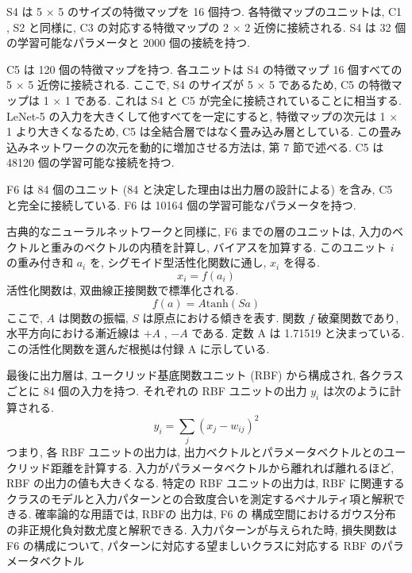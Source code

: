 \documentclass[twocolumn]{jarticle}     %
\begin{document}
  \par
  S4 は 5 × 5 のサイズの特徴マップを 16 個持つ. 各特徴マップのユニットは, C1 , S2 と同様に, C3 の対応する特徴マップの 2 × 2 近傍に接続される. S4 は 32 個の学習可能なパラメータと 2000 個の接続を持つ.
  \par
  C5 は 120 個の特徴マップを持つ. 各ユニットは S4 の特徴マップ 16 個すべての 5 × 5 近傍に接続される.
  ここで, S4 のサイズが 5 × 5 であるため, C5 の特徴マップは 1 × 1 である. これは S4 と C5 が完全に接続されていることに相当する. LeNet-5 の入力を大きくして他すべてを一定にすると, 特徴マップの次元は 1 × 1 より大きくなるため, C5 は全結合層ではなく畳み込み層としている. この畳み込みネットワークの次元を動的に増加させる方法は, 第 7 節で述べる. C5 は 48120 個の学習可能な接続を持つ.
\par
F6 は 84 個のユニット (84 と決定した理由は出力層の設計による) を含み, C5 と完全に接続している. F6 は 10164 個の学習可能なパラメータを持つ. 
\par
古典的なニューラルネットワークと同様に, F6 までの層のユニットは, 入力のベクトルと重みのベクトルの内積を計算し, バイアスを加算する. このユニット $i$ の重み付き和 $a_i$ を, シグモイド型活性化関数に通し, $x_i$ を得る. 
\begin{equation}
  x_i = f(a_i)
\end{equation}
活性化関数は, 双曲線正接関数で標準化される.
\begin{equation}
   f(a) = A\mathrm{tanh}(Sa)
\end{equation}
ここで, $A$ は関数の振幅, $S$ は原点における傾きを表す. 関数 $f$ 破棄関数であり, 水平方向における漸近線は $+A$ , $-A$ である. 定数 A は 1.71519 と決まっている. この活性化関数を選んだ根拠は付録 A に示している.
\par
最後に出力層は, ユークリッド基底関数ユニット (RBF) から構成され, 各クラスごとに 84 個の入力を持つ. それぞれの RBF ユニットの出力 $y_i$ は次のように計算される.
\begin{equation}
  y_i = \sum_{j} (x_j - w_{ij})^2
\end{equation} 
つまり, 各 RBF ユニットの出力は, 出力ベクトルとパラメータベクトルとのユークリッド距離を計算する. 入力がパラメータベクトルから離れれば離れるほど, RBF の出力の値も大きくなる. 
特定の RBF ユニットの出力は, RBF に関連するクラスのモデルと入力パターンとの合致度合いを測定するペナルティ項と解釈できる.
確率論的な用語では, RBFの 出力は, F6 の 構成空間におけるガウス分布の非正規化負対数尤度と解釈できる.
入力パターンが与えられた時, 損失関数は F6 の構成について, パターンに対応する望ましいクラスに対応する RBF のパラメータベクトル
\end{document}
